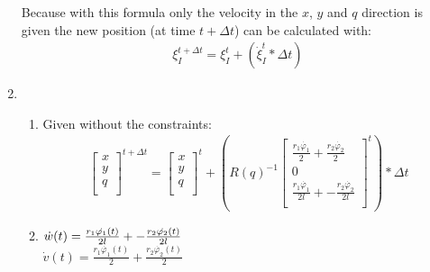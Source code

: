 \documentclass[a4paper, 20pt]{report}
\begin{document}
\begin{enumerate}
        Because with this formula only the velocity in the $x$, $y$ and $q$
        direction is given the new position (at time $t+\Delta t$) can be calculated with:
        \begin{align*}
            \xi^{t + \Delta t}_I = \xi^{t}_I + (\dot{\xi}^{t}_I *\Delta t )
        \end{align*}
    \item
    \begin{enumerate}{a}
    \item Given without the constraints:
                \begin{align*}
                    \begin{bmatrix}
                        x\\
                        y\\
                        q\\
                    \end{bmatrix}^{t + \Delta t}
                    = 
                    \begin{bmatrix}
                        x\\
                        y\\
                        q\\
                    \end{bmatrix}^{t}
                    +( R(q)^{-1}  
                    \begin{bmatrix}
                        \frac{r_1\dot{\varphi_1}}{2} + \frac{r_2\dot{\varphi_2}}{2}\\
                        0\\
                        \frac{r_1\dot{\varphi_1}}{2l} + -\frac{r_2\dot{\varphi_2}}{2l}\\ 
                    \end{bmatrix}^{t}) * \Delta t
                \end{align*}
        \item
            $ \dot{w}(t) = \large{\frac{r_1\dot{\varphi_1}(t)}{2l} +
                -\frac{r_2\dot{\varphi_2}(t)}{2l}}$\\
                $ \dot{v}(t) = \frac{r_1\dot{\varphi_1}(t)}{2} +
                \frac{r_2\dot{\varphi_2}(t)}{2}$
        \end{enumerate}
\end{enumerate}
\end{document}

